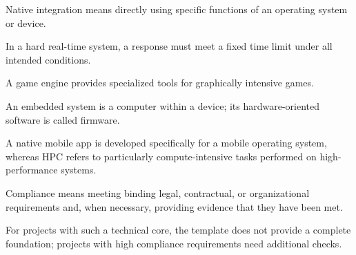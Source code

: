 \begin{beginnerstatement}

Native integration means directly using specific functions of an operating
system or device.

In a hard real-time system, a response must meet a fixed time limit under all
intended conditions.

A game engine provides specialized tools for graphically intensive games.

An embedded system is a computer within a device; its hardware-oriented
software is called firmware.

A native mobile app is developed specifically for a mobile operating system,
whereas HPC refers to particularly compute-intensive tasks performed on
high-performance systems.

Compliance means meeting binding legal, contractual, or organizational
requirements and, when necessary, providing evidence that they have been met.

For projects with such a technical core, the template does not provide a
complete foundation; projects with high compliance requirements need
additional checks.

\end{beginnerstatement}
